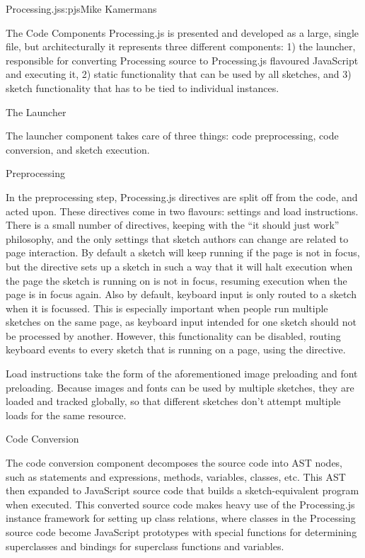 \begin{aosachapter}{Processing.js}{s:pjs}{Mike Kamermans}
\begin{aosasect1}{The Code Components}
Processing.js is presented and developed as a large, single file, but
architecturally it represents three different components: 1) the
launcher, responsible for converting Processing source to
Processing.js flavoured JavaScript and executing it, 2) static
functionality that can be used by all sketches, and 3) sketch
functionality that has to be tied to individual instances.

\begin{aosasect2}{The Launcher}

The launcher component takes care of three things: code preprocessing,
code conversion, and sketch execution.

\begin{aosasect3}{Preprocessing}

In the preprocessing step, Processing.js directives are split off from
the code, and acted upon. These directives come in two flavours:
settings and load instructions. There is a small number of directives,
keeping with the ``it should just work'' philosophy, and the only
settings that sketch authors can change are related to page
interaction. By default a sketch will keep running if the page is not
in focus, but the  directive sets up a sketch in
such a way that it will halt execution when the page the sketch is
running on is not in focus, resuming execution when the page is in
focus again. Also by default, keyboard input is only routed to a
sketch when it is focussed. This is especially important when people
run multiple sketches on the same page, as keyboard input intended for
one sketch should not be processed by another. However, this
functionality can be disabled, routing keyboard events to every sketch
that is running on a page, using the  directive.

Load instructions take the form of the aforementioned image preloading
and font preloading. Because images and fonts can be used by multiple
sketches, they are loaded and tracked globally, so that different
sketches don't attempt multiple loads for the same resource.

\end{aosasect3}

\begin{aosasect3}{Code Conversion}

The code conversion component decomposes the source code into AST
nodes, such as statements and expressions, methods, variables,
classes, etc. This AST then expanded to JavaScript source code that
builds a sketch-equivalent program when executed. This converted
source code makes heavy use of the Processing.js instance framework
for setting up class relations, where classes in the Processing source
code become JavaScript prototypes with special functions for
determining superclasses and bindings for superclass functions and
variables.


\end{aosasect3}
\end{aosasect2}
\end{aosasect1}
\end{aosachapter}
